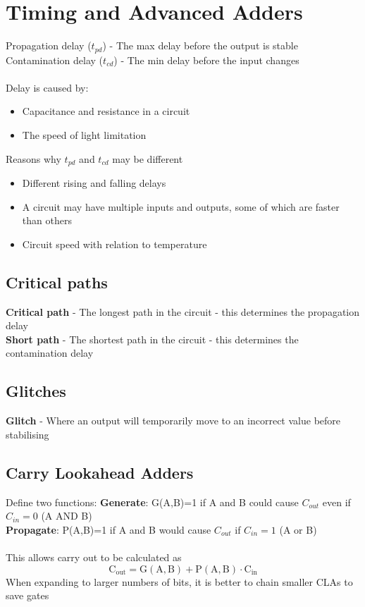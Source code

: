 \documentclass{article}[18pt]
\begin{document}
\section{Timing and Advanced Adders}
Propagation delay ($t_{pd}$) - The max delay before the output is stable\\
Contamination delay ($t_{cd}$) - The min delay before the input changes\\
\\
Delay is caused by:
\begin{itemize}
	\item Capacitance and resistance in a circuit
	\item The speed of light limitation
\end{itemize}
Reasons why $t_{pd}$ and $t_{cd}$ may be different
\begin{itemize}
	\item Different rising and falling delays
	\item A circuit may have multiple inputs and outputs, some of which are faster than others
	\item Circuit speed with relation to temperature
\end{itemize}
\subsection{Critical paths}
\textbf{Critical path} - The longest path in the circuit - this determines the propagation delay\\
\textbf{Short path} - The shortest path in the circuit - this determines the contamination delay
\subsection{Glitches}
\textbf{Glitch} - Where an output will temporarily move to an incorrect value before stabilising
\subsection{Carry Lookahead Adders}
Define two functions:
\textbf{Generate}: G(A,B)=1 if A and B could cause $C_{out}$ even if $C_{in}=0$ (A AND B)\\
\textbf{Propagate}: P(A,B)=1 if A and B would cause $C_{out}$ if $C_{in}=1$ (A or B)\\
\\
This allows carry out to be calculated as
\[
\mathrm{C}_{\mathrm{out}}=\mathrm{G}(\mathrm{A}, \mathrm{B})+\mathrm{P}(\mathrm{A}, \mathrm{B}) \cdot \mathrm{C}_{\mathrm{in}}
\]
When expanding to larger numbers of bits, it is better to chain smaller CLAs to save gates
\end{document}
